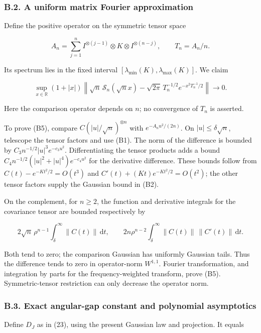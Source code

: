 \documentclass[
  british,
  11pt,
  a4paper,
]{article}
\begin{document}
\subsubsection{B.2. A uniform matrix Fourier
approximation}\label{b.2.-a-uniform-matrix-fourier-approximation}

Define the positive operator on the symmetric tensor space

\[
A_n=\sum_{j=1}^n I^{\otimes(j-1)}\otimes K\otimes I^{\otimes(n-j)},
\qquad T_n=A_n/n.
\]

Its spectrum lies in the fixed interval
\([\lambda_{\min}(K),\lambda_{\max}(K)]\). We claim

\[
\sup_{x\in\mathbb R}(1+|x|)\left\|
\sqrt n\,\mathcal S_n(\sqrt n x)
-\sqrt{2\pi}\,T_n^{-1/2}e^{-x^2T_n^{-1}/2}
\right\|\longrightarrow0. \tag{B5}
\]

Here the comparison operator depends on \(n\); no convergence of \(T_n\)
is asserted.

To prove (B5), compare \(C(|u|/\sqrt n)^{\otimes n}\) with
\(e^{-A_nu^2/(2n)}\). On \(|u|\le\delta\sqrt n\), telescope the tensor
factors and use (B1). The norm of the difference is bounded by
\(C_3n^{-1/2}|u|^3e^{-c_3u^2}\). Differentiating the tensor products
adds a bound \(C_4n^{-1/2}(|u|^2+|u|^4)e^{-c_4u^2}\) for the derivative
difference. These bounds follow from \(C(t)-e^{-Kt^2/2}=O(t^3)\) and
\(C'(t)+(Kt)e^{-Kt^2/2}=O(t^2)\); the other tensor factors supply the
Gaussian bound in (B2).

On the complement, for \(n\ge2\), the function and derivative integrals
for the covariance tensor are bounded respectively by

\[
2\sqrt n\,\rho^{n-1}\int_\delta^\infty\|C(t)\|\,\mathrm dt,
\qquad
2n\rho^{n-2}\int_\delta^\infty\|C(t)\|\,\|C'(t)\|\,\mathrm dt.
\]

Both tend to zero; the comparison Gaussian has uniformly Gaussian tails.
Thus the difference tends to zero in operator-norm \(W^{1,1}\). Fourier
transformation, and integration by parts for the frequency-weighted
transform, prove (B5). Symmetric-tensor restriction can only decrease
the operator norm.

\subsubsection{B.3. Exact angular-gap constant and polynomial
asymptotics}\label{b.3.-exact-angular-gap-constant-and-polynomial-asymptotics}

Define \(D_J\) as in (23), using the present Gaussian law and
projection. It equals
\end{document}
